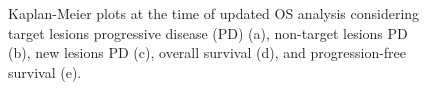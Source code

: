 \documentclass[12pt]{article}
\begin{document}
\newpage
\begin{figure}[H]
    \centering
    \hfill
    \hfill
    \caption{Kaplan-Meier plots at the time of updated OS analysis considering target lesions progressive disease (PD) (a), non-target lesions PD (b), new lesions PD (c), overall survival (d), and progression-free survival (e).}
\end{figure}
\end{document}
